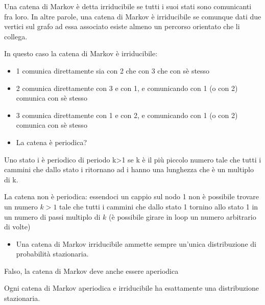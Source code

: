 \documentclass{article}
\begin{document}
\begin{mdframed}[hidealllines=true,backgroundcolor=blue!20]
Una catena di Markov è detta irriducibile se tutti i suoi stati sono
comunicanti fra loro.
In altre parole, una catena di Markov è irriducibile se comunque dati due
vertici sul grafo ad essa associato esiste almeno un percorso orientato che li
collega.
\end{mdframed} 

In questo caso la catena di Markov è irriducibile:

\begin{itemize}
	\item 1 comunica direttamente sia con 2 che con 3 che con sè stesso
    \item 2 comunica direttamente con 3 e con 1, e comunicando con 1 (o con 2) comunica con sè stesso
    \item 3 comunica direttamente con 1 e con 2, e comunicando con 1 (o con 2) comunica con sè stesso
    
\end{itemize}


\begin{itemize}
	\item La catena è periodica? 
\end{itemize}

\begin{mdframed}[hidealllines=true,backgroundcolor=blue!20]
Uno stato i è periodico di periodo k>1 se k è il più piccolo
numero tale che tutti i cammini che dallo stato i ritornano ad i
hanno una lunghezza che è un multiplo di k.
\end{mdframed} 

La catena non è periodica: essendoci un cappio sul nodo 1 non è possibile trovare un numero $k > 1$ tale che tutti i cammini che dallo stato 1 tornino allo stato 1 in un numero di passi multiplo di $k$ (è possibile girare in loop un numero arbitrario di volte)




\pagebreak

\begin{itemize}
	\item Una catena di Markov irriducibile ammette sempre un’unica distribuzione di probabilità stazionaria.
\end{itemize}

Falso, la catena di Markov deve anche essere aperiodica

\begin{mdframed}[hidealllines=true,backgroundcolor=blue!20]
	Ogni catena di Markov aperiodica e irriducibile ha esattamente una distribuzione stazionaria.
\end{mdframed} 
\end{document}

